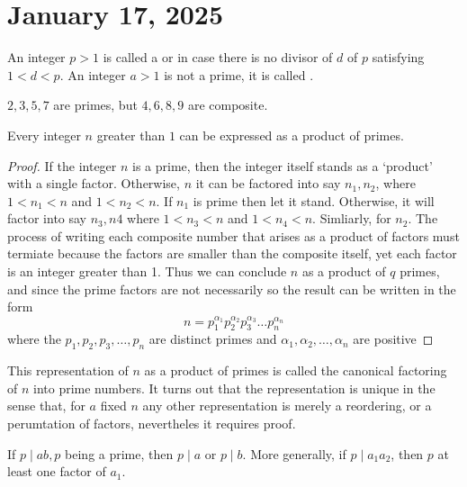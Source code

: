 \documentclass[11pt]{article}
\begin{document}
\section{January 17, 2025}
\begin{definition}
    An integer \(p > 1\) is called a  or  in case there is no divisor of \(d\) of \(p\) satisfying \(1 < d < p\). An integer \(a > 1\) is not a prime, it is called .
\end{definition}
\begin{example}
    \(2, 3, 5, 7\) are primes, but \(4, 6, 8, 9\) are composite.
\end{example}
\begin{theorem}
    Every integer \(n\) greater than \(1\) can be expressed as a product of primes.
\end{theorem}

\begin{proof}
    If the integer \(n\) is a prime, then the integer itself stands as a `product' with a single factor. Otherwise, \(n\) it can be factored into say \(n_1, n_2\), where \(1 < n_1 < n\) and \( 1 < n_2 < n\). If \(n_1\) is prime then let it stand. Otherwise, it will factor into say \(n_3, n4\) where \(1 < n_3 < n\) and \(1 < n_4 < n\). Simliarly, for \(n_2\). The process of writing each composite number that arises as a product of factors must termiate because the factors are smaller than the composite itself, yet each factor is an integer greater than 1. Thus we can conclude \(n\) as a product of \(q\) primes, and since the prime factors are not necessarily so the result can be written in the form
    \[ n = p_1^{\alpha_1}p_2^{\alpha_2}p_3^{\alpha_3}\ldots p_n^{\alpha_n}\]
    where the \(p_1, p_2, p_3, \ldots, p_n\) are distinct primes and \(\alpha_1,
    \alpha_2, \ldots, \alpha_n\) are positive
\end{proof}
\begin{fact}
    This representation of \(n\) as a product of primes is called the canonical
    factoring of \(n\) into prime numbers. It turns out that the representation is
    unique in the sense that, for \(a\) fixed \(n\) any other representation is
    merely a reordering, or a perumtation of factors, nevertheles it requires
    proof.
\end{fact}

\begin{theorem}
    If \(p \mid ab, p\) being a prime, then \(p \mid a\) or \(p \mid b\). More generally, if \(p \mid a_1 a_2\), then \(p\) at least one factor of \(a_1\).
\end{theorem}
\end{document}

